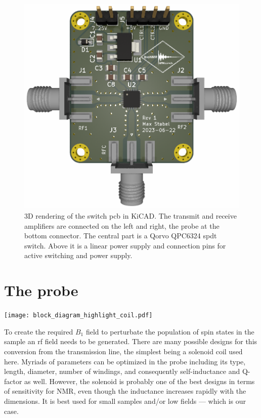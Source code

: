 \begin{figure}[hbt]
    \centering
    \includegraphics[width=\textwidth]{images/tr_switch.png}
    \caption{ 3D rendering of the switch \acrshort{pcb} in KiCAD. The transmit and receive amplifiers are connected on the left and right, the probe at the bottom connector. The central part is a Qorvo QPC6324 \acrfull{spdt} switch. Above it is a linear power supply and connection pins for active switching and power supply.}
\end{figure}

\section{The probe}
\begin{marginfigure}
    \texttt{[image: block\_diagram\_highlight\_coil.pdf]}
\end{marginfigure}
To create the required \(B_1\) field to perturbate the population of spin states in the sample an \acrshort{rf} field needs to be generated. There are many possible designs for this conversion from the transmission line, the simplest being a solenoid coil used here. Myriads of parameters can be optimized in the probe including its type, length, diameter, number of windings, and consequently self-inductance and Q-factor as well. However, the solenoid is probably one of the best designs in terms of sensitivity for NMR, even though the inductance increases rapidly with the dimensions. It is best used for small samples and/or low fields  --- which is our case.

